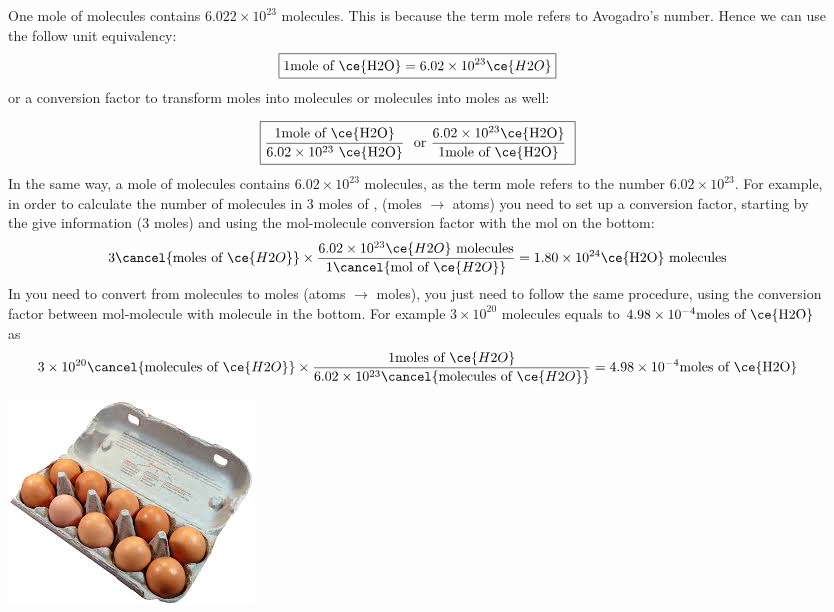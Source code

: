 \documentclass[main.tex]{subfiles}
\begin{document}
\begin{description}
\item[] One mole of molecules contains  $6.022\times 10^{23}$ molecules. This is because the term mole refers to Avogadro's number. Hence we can use the follow unit equivalency:
\begin{equation*}
\boxed{   1 \text{mole of \ce{H2O}}=6.02\times 10^{23} \ce{H2O}   }
\end{equation*}
or a conversion factor to transform moles into molecules or molecules into moles as well:

\begin{equation*}
\boxed{   \frac{1 \text{mole of \ce{H2O}}}{6.02\times 10^{23}\text{ \ce{H2O}}}\ \text{ or  } \frac{6.02\times 10^{23} \text{\ce{H2O}}}{1 \text{mole of \ce{H2O}}}\     }
\end{equation*}
In the same way, a mole of molecules contains $6.02\times 10^{23}$ molecules, as the term mole refers to the number $6.02\times 10^{23}$. For example, in order to calculate the number of  molecules in 3 moles of ,  (moles $\rightarrow$ atoms) you need to set up a conversion factor, starting by the give information (3 moles) and using the mol-molecule conversion factor with the mol on the bottom:
\begin{equation*}
3   \cancel{\text{moles of }\ce{H2O}} \times 
\dfrac{6.02\times 10^{23} \ce{H2O} \text{ molecules}  } {  1\cancel{\text{mol of }\ce{H2O}}} =1.80\times 10^{24}\text{\ce{H2O} molecules}
\end{equation*}
In you need to convert from molecules to moles (atoms $\rightarrow$ moles), you just need to follow the same procedure, using the conversion factor between mol-molecule with molecule in the bottom. For example $3\times 10^{20}$  molecules equals to $4.98\times 10^{-4}\text{moles of \ce{H2O}}$ as
\begin{equation*}
3\times 10^{20}   \cancel{\text{molecules of }\ce{H2O}} \times 
\dfrac{ 1 \text{moles of }\ce{H2O}   } {  6.02\times 10^{23} \cancel{\text{molecules of }\ce{H2O}}} =4.98\times 10^{-4}\text{moles of \ce{H2O}}
\end{equation*}
\begin{marginfigure}[-7cm]%
      \includegraphics{chapter7/figure2}

\end{marginfigure}
\end{description}
\end{document}
